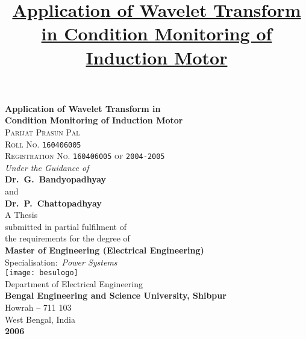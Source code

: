 \documentclass[a4paper,11pt]{report}
\title{\underline{\large{Application of Wavelet Transform in Condition Monitoring of Induction Motor}}}
\date{}
\author{}
\begin{document}
\begin{titlepage}
\begin{center}
{\huge \textbf{Application of Wavelet Transform in}}\\
\vspace{3.5pt}
{\huge \textbf{Condition Monitoring of Induction Motor}}\\
\vspace{0.5in}
{\LARGE \textsc{Parijat Prasun Pal}}\\
\vspace{3.5pt}
{\Large \textsc{Roll No.} \texttt{160406005}}\\
\vspace{3pt}
{\Large \textsc{Registration No.} \texttt{160406005} \textsc{of} \texttt{2004-2005}}\\
\vspace{0.5in}
{\large \textit{Under the Guidance of}}\\
\vspace{5pt}
{\Large \textbf{Dr.~G.~Bandyopadhyay}}\\
\vspace{3pt}
{\large and}\\
\vspace{3pt}
{\Large \textbf{Dr.~P.~Chattopadhyay}}\\
\vspace{0.75in}
{\Large A Thesis}\\
\vspace{3pt}
\Large{submitted in partial fulfilment of}\\
\vspace{3pt}
\Large{the requirements for the degree of}\\
\vspace{4.5pt}
{\Large \textbf{Master of Engineering (Electrical Engineering)}}\\
\vspace{3.5pt}
{\Large Specialisation:~\textit{Power Systems}}\\
\vspace{0.5in}
\texttt{[image: besulogo]}\\
\vspace{0.5in}
{\Large \textsf{Department of Electrical Engineering}}\\
\vspace{3.5pt}
{\Large \textbf{Bengal Engineering and Science University, Shibpur}}\\
\vspace{3.5pt}
{\Large Howrah -- 711 103}\\
\vspace{3.5pt}
{\Large West Bengal, India}\\
\vfill
{\Large \textbf{2006}} 
\end{center}
\end{titlepage}
\end{document}
